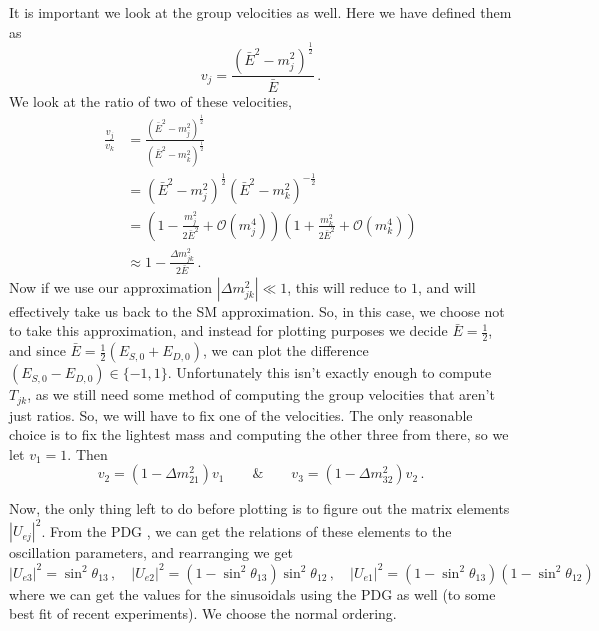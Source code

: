 \documentclass[10pt]{article}
\begin{document}
It is important we look at the group velocities as well. Here we have defined them as
\begin{equation}
  v_{j} = \frac{\left(\bar{E}^{2} - m_{j}^{2}\right)^{\frac{1}{2}}}{\bar{E}}\, .
\end{equation}
We look at the ratio of two of these velocities,
\begin{equation}
  \begin{split}
    \frac{v_{j}}{v_{k}} & = \frac{\left(\bar{E}^{2} - m_{j}^{2}\right)^{\frac{1}{2}}}{\left(\bar{E}^{2} - m_{k}^{2}\right)^{\frac{1}{2}}} \\
    & = \left(\bar{E}^{2} - m_{j}^{2}\right)^{\frac{1}{2}}\left(\bar{E}^{2} - m_{k}^{2}\right)^{-\frac{1}{2}} \\
    & = \left(1 - \frac{m_{j}^{2}}{2\bar{E}^{2}} + \mathcal{O}(m_{j}^{4})\right)\left(1 + \frac{m_{k}^{2}}{2\bar{E}^{2}} + \mathcal{O}(m_{k}^{4})\right) \\
    & \approx 1 - \frac{\Delta m_{jk}^{2}}{2\bar{E}} \, .
  \end{split}
\end{equation}
Now if we use our approximation $|\Delta m_{jk}^{2}| \ll 1$, this will reduce to $1$, and will effectively take us back to the SM approximation. So, in this case, we choose not to take this approximation, and instead for plotting purposes we decide $\bar{E} = \frac{1}{2}$, and since $\bar{E} = \frac{1}{2}(E_{S,0} + E_{D,0})$, we can plot the difference $(E_{S,0} - E_{D,0})\in \{-1, 1\}$. Unfortunately this isn't exactly enough to compute $T_{jk}$, as we still need some method of computing the group velocities that aren't just ratios. So, we will have to fix one of the velocities. The only reasonable choice is to fix the lightest mass and computing the other three from there, so we let $v_{1} = 1$. Then
\begin{equation}
  v_{2} = \left(1 - \Delta m_{21}^{2}\right)v_{1} \hspace{2em} \& \hspace{2em} v_{3} = \left(1 - \Delta m_{32}^{2}\right)v_{2}\,.
\end{equation}

Now, the only thing left to do before plotting is to figure out the matrix elements $|U_{ej}|^{2}$. From the PDG \cite{pdg_true}, we can get the relations of these elements to the oscillation parameters, and rearranging we get
\begin{equation}
  |U_{e3}|^{2} = \sin^{2}\theta_{13}\, , \quad |U_{e2}|^{2} = (1-\sin^{2}\theta_{13})\sin^{2}\theta_{12}\, , \quad |U_{e1}|^{2} = (1-\sin^{2}\theta_{13})(1 - \sin^{2}\theta_{12})
\end{equation}
where we can get the values for the sinusoidals using the PDG \cite{pdg_true} as well (to some best fit of recent experiments). We choose the normal ordering.
\end{document}
